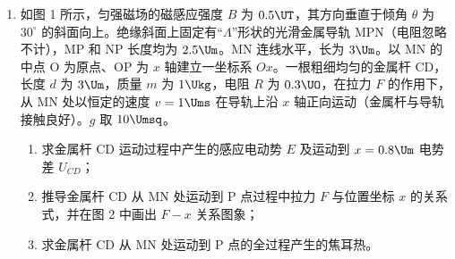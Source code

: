 \documentclass[\gkver]{gaokaozhenti}
\begin{document}
\begin{enumerate}
{（2）在极板间带电小球受重力和电场力，有 $mg-qE=ma$，$0-v^{2}=2ad$，得 $E=\frac{mg(h+d)}{qd}$；由 $U=Ed$，$Q=CU$，得 $Q=C\frac{mg(h+d)}{q}$。

（3）由 $h=\frac{1}{2}gt_{1}^{2}$，$0=v+at_{2}$，综合可得 $t=\frac{h+d}{h}\sqrt{\frac{2h}{g}}$。
}

\item
如图 1 所示，匀强磁场的磁感应强度 $B$ 为 $0.5\UT$，其方向垂直于倾角 $\theta$ 为 $30^\circ$ 的斜面向上。绝缘斜面上固定有“$\Lambda$”形状的光滑金属导轨 MPN（电阻忽略不计），MP 和 NP 长度均为 $2.5\Um$。MN 连线水平，长为 $3\Um$。以 MN 的中点 O 为原点、OP 为 $x$ 轴建立一坐标系 $Ox$。一根粗细均匀的金属杆 CD，长度 $d$ 为 $3\Um$，质量 $m$ 为 $1\Ukg$，电阻 $R$ 为 $0.3\UO$，在拉力 $F$ 的作用下，从 MN 处以恒定的速度 $v=1\Ums$ 在导轨上沿 $x$ 轴正向运动（金属杆与导轨接触良好）。$g$ 取 $10\Umsq$。
\begin{enumerate}
	\item
	求金属杆 CD 运动过程中产生的感应电动势 $E$ 及运动到 $x=0.8\Um$ 电势差 $U_{CD}$；
	\item
	推导金属杆 CD 从 MN 处运动到 P 点过程中拉力 $F$ 与位置坐标 $x$ 的关系式，并在图 2 中画出 $F-x$ 关系图象；
	\item
	求金属杆 CD 从 MN 处运动到 P 点的全过程产生的焦耳热。
\end{enumerate}
\end{enumerate}
\end{document}
